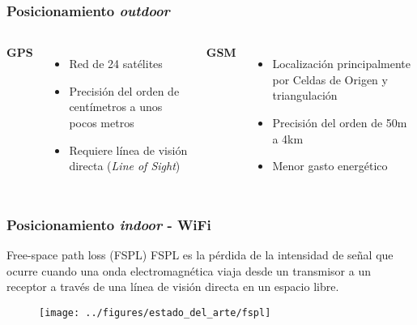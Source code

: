 \documentclass[mathserif]{beamer}
\begin{document}

\begin{frame}
\frametitle{Posicionamiento \textit{outdoor}}

\begin{columns}[t]


\textbf{GPS}

\begin{itemize}
\item Red de 24 satélites 
\item Precisión del orden de centímetros a unos pocos metros
\item Requiere línea de visión directa (\textit{Line of Sight})
\end{itemize}


\textbf{GSM}

\begin{itemize}
\item Localización principalmente por Celdas de Origen y triangulación
\item Precisión del orden de 50m a 4km
\item Menor gasto energético
\end{itemize}



\end{columns}
\end{frame}


\begin{frame}
\frametitle{Posicionamiento \textit{indoor} - WiFi}

\begin{block}{Free-space path loss (FSPL)}
FSPL es la pérdida de la intensidad de señal que ocurre cuando una onda electromagnética viaja desde un transmisor a un receptor a través de una línea de visión directa en un espacio libre.	
\end{block}

\begin{figure}
\texttt{[image: ../figures/estado\_del\_arte/fspl]}
\end{figure}

\end{frame}
\end{document}
